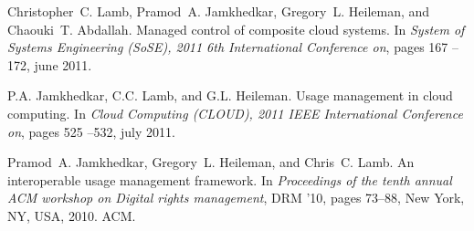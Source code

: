 \documentclass[margin,line]{resume}
\begin{document}
\begin{resume}
Christopher~C. Lamb, Pramod~A. Jamkhedkar, Gregory~L. Heileman, and Chaouki~T.
  Abdallah.
\newblock Managed control of composite cloud systems.
\newblock In {\em System of Systems Engineering (SoSE), 2011 6th International
  Conference on}, pages 167 --172, june 2011.

P.A. Jamkhedkar, C.C. Lamb, and G.L. Heileman.
\newblock Usage management in cloud computing.
\newblock In {\em Cloud Computing (CLOUD), 2011 IEEE International Conference
  on}, pages 525 --532, july 2011.

Pramod~A. Jamkhedkar, Gregory~L. Heileman, and Chris~C. Lamb.
\newblock An interoperable usage management framework.
\newblock In {\em Proceedings of the tenth annual ACM workshop on Digital
  rights management}, DRM '10, pages 73--88, New York, NY, USA, 2010. ACM.

\end{resume}
\end{document}
